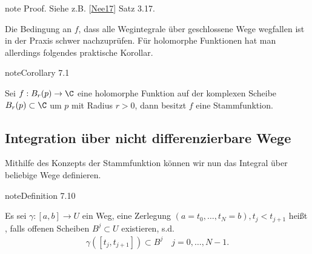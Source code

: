 \documentclass[letterpaper,10pt,german]{jupyterBook}
\begin{document}
\begin{sphinxadmonition}{note}
\sphinxAtStartPar
Proof. Siehe z.B. {[}\hyperlink{cite.references:id13}{Nee17}{]} Satz 3.17.
\end{sphinxadmonition}

\sphinxAtStartPar
Die Bedingung an \(f\), dass alle Wegintegrale über geschlossene Wege wegfallen ist in der Praxis schwer nachzuprüfen. Für holomorphe Funktionen hat man allerdings folgendes praktische Korollar.
\label{complexanalysis/kurvenintegrale:corollary-17}
\begin{sphinxadmonition}{note}{Corollary 7.1}



\sphinxAtStartPar
Sei \(f:B_r(p)\to\C\) eine holomorphe Funktion auf der komplexen Scheibe \(B_r(p)\subset\C\) um \(p\) mit Radius \(r>0\), dann besitzt \(f\) eine Stammfunktion.
\end{sphinxadmonition}


\subsection{Integration über nicht differenzierbare Wege}
\label{\detokenize{complexanalysis/kurvenintegrale:integration-uber-nicht-differenzierbare-wege}}
\sphinxAtStartPar
Mithilfe des Konzepts der Stammfunktion können wir nun das Integral über beliebige Wege definieren.
\label{complexanalysis/kurvenintegrale:definition-18}
\begin{sphinxadmonition}{note}{Definition 7.10}



\sphinxAtStartPar
Es sei \(\gamma:[a,b]\to U\) ein Weg, eine Zerlegung \((a=t_0,\ldots, t_N=b), t_j<t_{j+1}\) heißt , falls offenen Scheiben \(B^j\subset U\) existieren, s.d.
\begin{equation*}
\begin{split}\gamma([t_j,t_{j+1}])\subset B^j\quad j=0,\ldots,N-1.\end{split}
\end{equation*}\end{sphinxadmonition}
\end{document}
